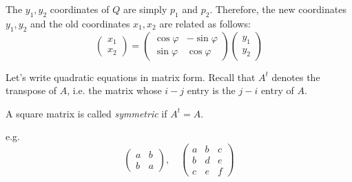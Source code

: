 \documentclass[10pt]{scrartcl}
\begin{document}
\begin{center}
\end{center}


The $y_1,y_2$ coordinates of $Q$ are simply $p_1$ and $p_2$. Therefore, the new coordinates $y_1,y_2$ and the old coordinates $x_1,x_2$ are related as follows:
\[
  \begin{pmatrix}
  x_1 \\ x_2	
  \end{pmatrix} = \begin{pmatrix}
 \cos\varphi & -\sin\varphi\\
 \sin\varphi & \cos\varphi 	
 \end{pmatrix} \begin{pmatrix}
 y_1 \\ y_2	
 \end{pmatrix}
 \]
 
 
Let's write quadratic equations in matrix form. Recall that $A^t$ denotes the transpose of $A$, i.e. the matrix whose $i-j$ entry is the $j-i$ entry of $A$. \\

\begin{definition}
A square matrix is called \emph{symmetric} if $A^t = A$.
\end{definition}

e.g. 
\[
  \begin{pmatrix}
  a & b \\ b & a	
  \end{pmatrix},\quad 
  \begin{pmatrix}
  a & b & c \\ b & d & e \\ c & e & f	
  \end{pmatrix}
\]
\end{document}
